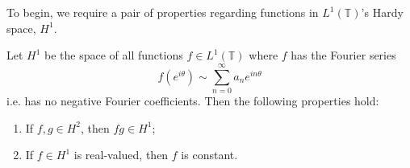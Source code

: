 \documentclass[../main.tex]{subfiles}
\begin{document}
To begin, we require a pair of properties regarding functions in
$L^1(\mathbb{T})$'s Hardy space, $H^1$. 

\begin{lemma}
\label{thm:h1-properties}
  Let $H^1$ be the space of all functions $f \in L^1(\mathbb{T})$ where $f$ has
  the Fourier series
  $$f(e^{i \theta}) \sim \sum_{n=0}^\infty a_n e^{i n \theta}$$
  i.e. has no negative Fourier coefficients. Then the following properties hold:
  \begin{enumerate}
    \item\label{item:h2-products-in-h1} If $f, g \in H^2$, then $fg \in H^1$;
    \item\label{item:f-h1-const} If $f \in H^1$ is real-valued, then $f$ is constant.
  \end{enumerate}
\end{lemma}
\end{document}
